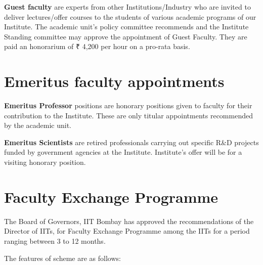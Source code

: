\documentclass[
  10pt,
  a5paper,
  10pt,
  openany]{amsbook}
\begin{document}
\textbf{Guest faculty} are experts from other Institutions/Industry who
are invited to deliver lectures/offer courses to the students of various
academic programs of our Institute. The academic unit's policy committee
recommends and the Institute Standing committee may approve the
appointment of Guest Faculty. They are paid an honorarium of ₹ 4,200 per
hour on a pro-rata basis.

\section{Emeritus faculty
appointments}\label{emeritus-faculty-appointments}

\textbf{Emeritus Professor} positions are honorary positions given to
faculty for their contribution to the Institute. These are only titular
appointments recommended by the academic unit.

\textbf{Emeritus Scientists} are retired professionals carrying out
specific R\&D projects funded by government agencies at the Institute.
Institute's offer will be for a visiting honorary position.

\section{Faculty Exchange Programme}\label{faculty-exchange-programme}

The Board of Governors, IIT Bombay has approved the recommendations of
the Director of IITs, for Faculty Exchange Programme among the IITs for
a period ranging between 3 to 12 months.

The features of scheme are as follows:
\end{document}
